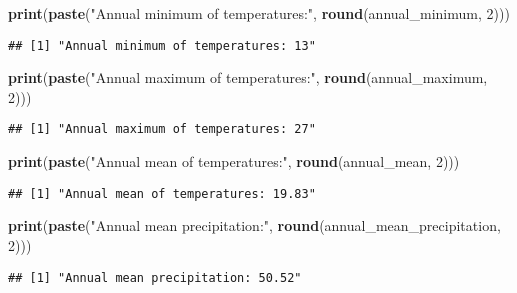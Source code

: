 \documentclass[
]{article}
\newenvironment{Shaded}{\begin{snugshade}}{\end{snugshade}}
\newcommand{\DecValTok}[1]{\textcolor[rgb]{0.00,0.00,0.81}{#1}}
\newcommand{\FunctionTok}[1]{\textcolor[rgb]{0.13,0.29,0.53}{\textbf{#1}}}
\newcommand{\NormalTok}[1]{#1}
\newcommand{\StringTok}[1]{\textcolor[rgb]{0.31,0.60,0.02}{#1}}
\begin{document}
\begin{Shaded}
\begin{Highlighting}[]
\FunctionTok{print}\NormalTok{(}\FunctionTok{paste}\NormalTok{(}\StringTok{"Annual minimum of temperatures:"}\NormalTok{, }\FunctionTok{round}\NormalTok{(annual\_minimum, }\DecValTok{2}\NormalTok{)))}
\end{Highlighting}
\end{Shaded}

\begin{verbatim}
## [1] "Annual minimum of temperatures: 13"
\end{verbatim}

\begin{Shaded}
\begin{Highlighting}[]
\FunctionTok{print}\NormalTok{(}\FunctionTok{paste}\NormalTok{(}\StringTok{"Annual maximum of temperatures:"}\NormalTok{, }\FunctionTok{round}\NormalTok{(annual\_maximum, }\DecValTok{2}\NormalTok{)))}
\end{Highlighting}
\end{Shaded}

\begin{verbatim}
## [1] "Annual maximum of temperatures: 27"
\end{verbatim}

\begin{Shaded}
\begin{Highlighting}[]
\FunctionTok{print}\NormalTok{(}\FunctionTok{paste}\NormalTok{(}\StringTok{"Annual mean of temperatures:"}\NormalTok{, }\FunctionTok{round}\NormalTok{(annual\_mean, }\DecValTok{2}\NormalTok{)))}
\end{Highlighting}
\end{Shaded}

\begin{verbatim}
## [1] "Annual mean of temperatures: 19.83"
\end{verbatim}

\begin{Shaded}
\begin{Highlighting}[]
\FunctionTok{print}\NormalTok{(}\FunctionTok{paste}\NormalTok{(}\StringTok{"Annual mean precipitation:"}\NormalTok{, }\FunctionTok{round}\NormalTok{(annual\_mean\_precipitation, }\DecValTok{2}\NormalTok{)))}
\end{Highlighting}
\end{Shaded}

\begin{verbatim}
## [1] "Annual mean precipitation: 50.52"
\end{verbatim}
\end{document}
